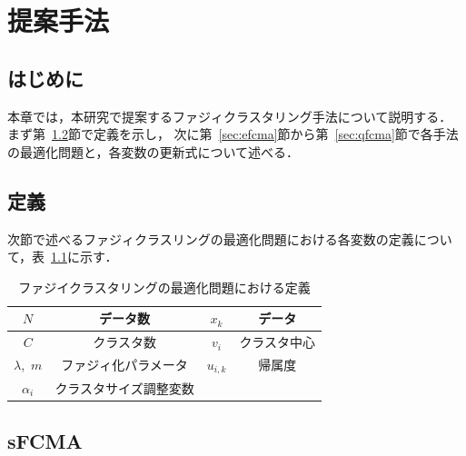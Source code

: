 \documentclass[a4j,12pt,dvipdfmx,oneside]{jsbook}
\theoremstyle{definition}
\begin{document}
\chapter{提案手法}\label{chap:suggest_method}

 \section{はじめに}\label{sec:suggest_method_intro}
 本章では，本研究で提案するファジィクラスタリング手法について説明する．
 まず第~\ref{sec:suggest_method_define}節で定義を示し，
 次に第~\ref{sec:efcma}節から第~\ref{sec:qfcma}節で各手法の最適化問題と，各変数の更新式について述べる．
 
 \section{定義}\label{sec:suggest_method_define}
 
 次節で述べるファジィクラスリングの最適化問題における各変数の定義について，表~\ref{tab:fuzzy_c_define}に示す．
 \begin{table}[htbp]
  \caption{ファジイクラスタリングの最適化問題における定義}
  \begin{center}
   \begin{tabular}{c|c||c|c} \hline
    {$N$}&データ数&{$x_k$}&データ \\ \hline
    {$C$}&クラスタ数&{$v_i$}&クラスタ中心\\ \hline
    {$\lambda$,~$m$}&ファジィ化パラメータ&{$u_{i,k}$}&帰属度 \\ \hline
    {$\alpha_i$}&クラスタサイズ調整変数\\ \hline
   \end{tabular}
  \end{center}
  \label{tab:fuzzy_c_define}
 \end{table}

 \section{sFCMA}\label{sec:sfcma}
 
\end{document}
